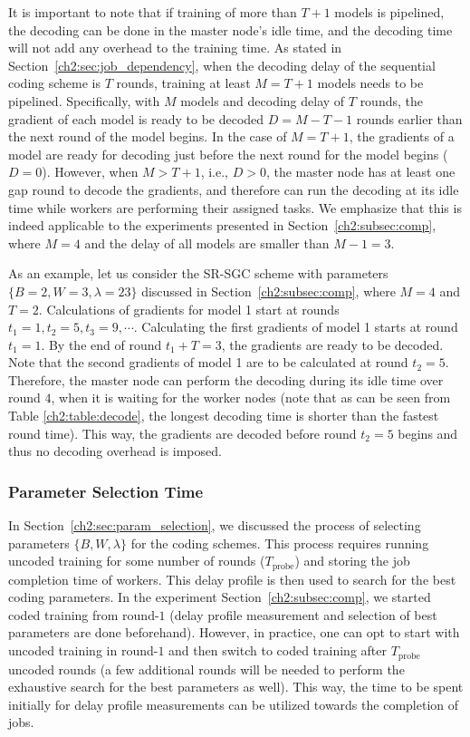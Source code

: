 It is important to note that if training of more than $T+1$ models is pipelined, the decoding can be done in the master node's idle time, and the decoding time will not add any overhead to the training time. As stated in Section~\ref{ch2:sec:job_dependency}, when the decoding delay of the sequential coding scheme is $T$ rounds, training at least $M = T+1$ models needs to be pipelined.
Specifically, with $M$ models and decoding delay of $T$ rounds, the gradient of each model is ready to be decoded $D = M-T-1$ rounds earlier than the next round of the model begins. In the case of $M=T+1$, the gradients of a model are ready for decoding just before the next round for the model begins ($D=0$). However, when $M > T + 1$, i.e., $D > 0$, the master node has at least one gap round to decode the gradients, and therefore can run the decoding at its idle time while workers are performing their assigned tasks. We emphasize that this is indeed applicable to the experiments presented in Section~\ref{ch2:subsec:comp}, where $M=4$ and the delay of all models are smaller than $M-1=3$.

As an example, let us consider the SR-SGC scheme with parameters $\{B=2, W=3, \lambda=23\}$ discussed in Section~\ref{ch2:subsec:comp}, where $M=4$ and $T=2$. Calculations of gradients for model 1 start at rounds $t_1=1, t_2=5, t_3=9, \cdots$. Calculating the first gradients of model 1 starts at round $t_1=1$. By the end of round $t_1+T=3$, the gradients are ready to be decoded. Note that the second gradients of model 1 are to be calculated at round $t_2=5$. Therefore, the master node can perform the decoding during its idle time over round $4$, when it is waiting for the worker nodes (note that as can be seen from Table \ref{ch2:table:decode}, the longest decoding time is shorter than the fastest round time). This way, the gradients are decoded before round $t_2=5$ begins and thus no decoding overhead is imposed.

\subsubsection{Parameter Selection Time}

In Section~\ref{ch2:sec:param_selection}, we discussed the process of selecting parameters $\{B, W, \lambda\}$ for the coding schemes. This process requires running uncoded training for some number of rounds ($T_\text{probe}$) and storing the job completion time of workers. This delay profile is then used to search for the best coding parameters. In the experiment Section~\ref{ch2:subsec:comp}, we started coded training from round-$1$  (delay profile measurement and selection of best parameters are done beforehand). However, in practice, one can opt to start with uncoded training in round-$1$ and then switch to coded training after  $T_\text{probe}$ uncoded rounds (a few additional rounds will be needed to perform the exhaustive search for the best parameters as well). This way, the time to be spent initially for delay profile measurements can be utilized towards the completion of jobs.

